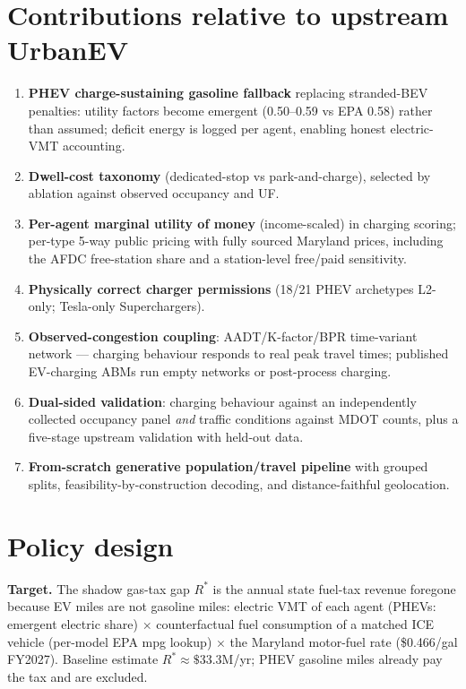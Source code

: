 \documentclass[11pt]{article}
\begin{document}
\section{Contributions relative to upstream UrbanEV}
\begin{enumerate}\itemsep1pt
  \item \textbf{PHEV charge-sustaining gasoline fallback} replacing stranded-BEV
  penalties: utility factors become emergent (0.50--0.59 vs EPA 0.58) rather than
  assumed; deficit energy is logged per agent, enabling honest electric-VMT
  accounting.
  \item \textbf{Dwell-cost taxonomy} (dedicated-stop vs park-and-charge), selected
  by ablation against observed occupancy and UF.
  \item \textbf{Per-agent marginal utility of money} (income-scaled) in charging
  scoring; per-type 5-way public pricing with fully sourced Maryland prices,
  including the AFDC free-station share and a station-level free/paid sensitivity.
  \item \textbf{Physically correct charger permissions} (18/21 PHEV archetypes
  L2-only; Tesla-only Superchargers).
  \item \textbf{Observed-congestion coupling}: AADT/K-factor/BPR time-variant
  network — charging behaviour responds to real peak travel times; published
  EV-charging ABMs run empty networks or post-process charging.
  \item \textbf{Dual-sided validation}: charging behaviour against an
  independently collected occupancy panel \emph{and} traffic conditions against
  MDOT counts, plus a five-stage upstream validation with held-out data.
  \item \textbf{From-scratch generative population/travel pipeline} with grouped
  splits, feasibility-by-construction decoding, and distance-faithful geolocation.
\end{enumerate}

\section{Policy design}
\label{sec:policy}
\textbf{Target.} The shadow gas-tax gap $R^{*}$ is the annual state fuel-tax
revenue foregone because EV miles are not gasoline miles: electric VMT of each
agent (PHEVs: emergent electric share) $\times$ counterfactual fuel consumption of
a matched ICE vehicle (per-model EPA mpg lookup) $\times$ the Maryland motor-fuel
rate (\$0.466/gal FY2027). Baseline estimate $R^{*}\approx\$33.3$M/yr; PHEV
gasoline miles already pay the tax and are excluded.
\end{document}
